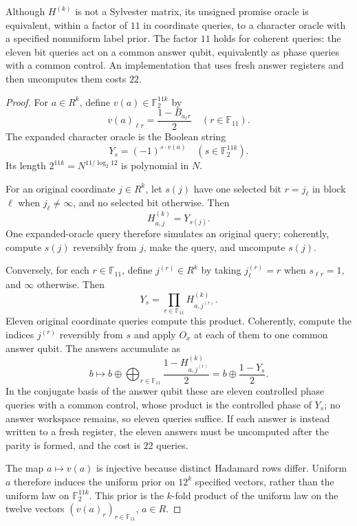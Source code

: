 \begin{proposition}
\label{ian:hadamard-character-encoding}
Although \(H^{(k)}\) is not a Sylvester matrix, its unsigned promise oracle is equivalent, within a factor of \(11\) in coordinate queries, to a character oracle with a specified nonuniform label prior. The factor \(11\) holds for coherent queries: the eleven bit queries act on a common answer qubit, equivalently as phase queries with a common control. An implementation that uses fresh answer registers and then uncomputes them costs \(22\).
\end{proposition}
\begin{proof}
For \(a\in R^k\), define \(v(a)\in\mathbb F_2^{11k}\) by
\[
 v(a)_{\ell r}=\frac{1-B_{a_\ell r}}2
 \quad(r\in\mathbb F_{11}).
\]
The expanded character oracle is the Boolean string
\[
 Y_s=(-1)^{s\cdot v(a)}
 \quad(s\in\mathbb F_2^{11k}).
\]
Its length \(2^{11k}=N^{11/\log_2 12}\) is polynomial in \(N\).

For an original coordinate \(j\in R^k\), let \(s(j)\) have one selected bit \(r=j_\ell\) in block \(\ell\) when \(j_\ell\ne\infty\), and no selected bit otherwise. Then
\[
 H^{(k)}_{a,j}=Y_{s(j)}.
\]
One expanded-oracle query therefore simulates an original query; coherently, compute \(s(j)\) reversibly from \(j\), make the query, and uncompute \(s(j)\).

Conversely, for each \(r\in\mathbb F_{11}\), define \(j^{(r)}\in R^k\) by taking \(j^{(r)}_\ell=r\) when \(s_{\ell r}=1\), and \(\infty\) otherwise. Then
\[
 Y_s=\prod_{r\in\mathbb F_{11}}H^{(k)}_{a,j^{(r)}}.
\]
Eleven original coordinate queries compute this product. Coherently, compute the indices \(j^{(r)}\) reversibly from \(s\) and apply \(O_x\) at each of them to one common answer qubit. The answers accumulate as
\[
 b\longmapsto b\oplus\bigoplus_{r\in\mathbb F_{11}}\frac{1-H^{(k)}_{a,j^{(r)}}}2
 =b\oplus\frac{1-Y_s}2 .
\]
In the conjugate basis of the answer qubit these are eleven controlled phase queries with a common control, whose product is the controlled phase of \(Y_s\); no answer workspace remains, so eleven queries suffice. If each answer is instead written to a fresh register, the eleven answers must be uncomputed after the parity is formed, and the cost is \(22\) queries.

The map \(a\mapsto v(a)\) is injective because distinct Hadamard rows differ. Uniform \(a\) therefore induces the uniform prior on \(12^k\) specified vectors, rather than the uniform law on \(\mathbb F_2^{11k}\). This prior is the \(k\)-fold product of the uniform law on the twelve vectors \((v(a)_{r})_{r\in\mathbb F_{11}}\), \(a\in R\).
\end{proof}

